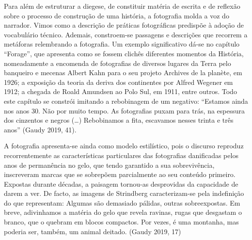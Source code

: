 \documentclass{article}
\begin{document}
Para além de estruturar a diegese, de constituir matéria de escrita e de reflexão
sobre o processo de construção de uma história, a fotografia molda a voz do narrador.
Vimos como a descrição de práticas fotográficas predispõe à adoção de vocabulário
técnico. Ademais, constroem-se passagens e descrições que recorrem a metáforas relembrando a fotografia. Um exemplo significativo dá-se no capítulo “Forage”, que
apresenta como se fossem clichês diferentes momentos da História, nomeadamente
a encomenda de fotografias de diversos lugares da Terra pelo banqueiro e mecenas
Albert Kahn para o seu projeto Archives de la planète, em 1926; a exposição da teoria
da deriva dos continentes por Alfred Wegener em 1912; a chegada de Roald Amundsen ao Polo Sul, em 1911, entre outros. Todo este capítulo se constrói imitando a
rebobinagem de um negativo: “Estamos ainda nos anos 30. Não por muito tempo. As
fotografias puxam para trás, na espessura dos cinzentos e negros (…) Rebobinamos
a fita, escavamos nesses trinta e três anos” (Gaudy 2019, 41).




A fotografia apresenta-se ainda como modelo estilístico, pois o discurso reproduz recorrentemente as características particulares das fotografias danificadas pelos
anos de permanência no gelo, que tendo garantido a sua sobrevivência, inscreveram
marcas que se sobrepõem parcialmente ao seu conteúdo primeiro. Expostas durante
décadas, a paisagem tornou-as desprovidas da capacidade de darem a ver. De facto,
as imagens de Strindberg caracterizam-se pela indefinição do que representam:
Algumas são demasiado pálidas, outras sobreexpostas. Em breve, adivinhamos
a matéria do gelo que revela ravinas, rugas que desgastam o branco, que o quebram em blocos compactos. Por vezes, é uma montanha, mas poderia ser, também, um animal deitado. (Gaudy 2019, 17)
\end{document}
